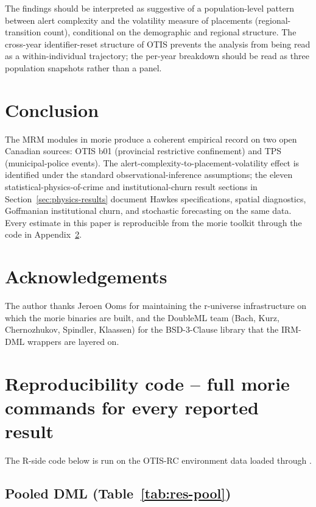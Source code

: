 \documentclass[article,shortnames,nojss]{jss}
\newcommand{\OTIS}{\textsf{OTIS}}
\newcommand{\TPS}{\textsf{TPS}}
\begin{document}
The findings should be interpreted as suggestive of a population-level
pattern between alert complexity and the volatility measure of placements (regional-transition count), conditional
on the demographic and regional structure. The cross-year
identifier-reset structure of \OTIS{} prevents the analysis from
being read as a within-individual trajectory; the per-year breakdown
should be read as three population snapshots rather than a panel.

\section{Conclusion}
\label{sec:conclusion}

The MRM modules in morie produce a coherent empirical record on
two open Canadian sources: \OTIS{} b01 (provincial restrictive
confinement) and \TPS{} (municipal-police events). The
alert-complexity-to-placement-volatility effect is identified under
the standard observational-inference assumptions; the eleven
statistical-physics-of-crime and institutional-churn result sections
in Section~\ref{sec:physics-results} document Hawkes specifications,
spatial diagnostics, Goffmanian institutional churn, and stochastic
forecasting on the same data. Every
estimate in this paper is reproducible from the morie toolkit
through the code in Appendix~\ref{app:reproducibility}.

\section*{Acknowledgements}

The author thanks Jeroen Ooms for maintaining the r-universe
infrastructure on which the morie binaries are built, and the
DoubleML team (Bach, Kurz, Chernozhukov, Spindler, Klaassen) for
the BSD-3-Clause library that the IRM-DML wrappers are layered on.

\appendix

\section{Reproducibility code -- full morie commands for every reported result}
\label{app:reproducibility}

The R-side code below is run on the OTIS-RC environment data loaded
through .

\subsection[Pooled DML]{Pooled DML (Table~\ref{tab:res-pool})}
\end{document}
